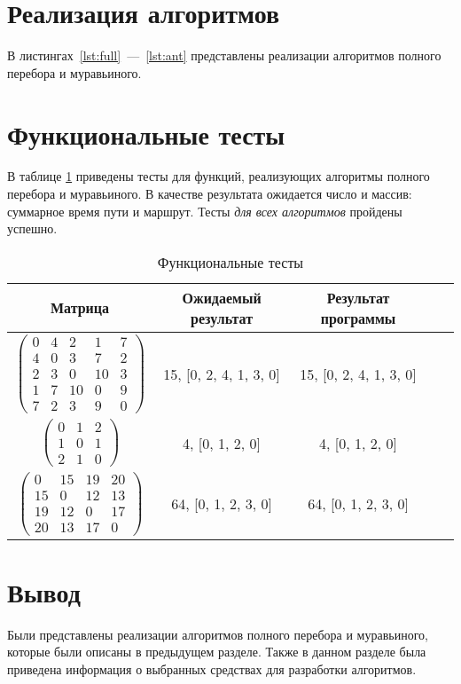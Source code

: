 \section{Реализация алгоритмов}

В листингах~\ref{lst:full}~---~\ref{lst:ant} представлены реализации алгоритмов полного перебора и муравьиного.





\section{Функциональные тесты}

В таблице \ref{tbl:functional_test} приведены тесты для функций, реализующих алгоритмы полного перебора и муравьиного. В качестве результата ожидается число и массив: суммарное время пути и маршрут. Тесты \textit{для всех алгоритмов} пройдены успешно. 

\newpage
\begin{center}
	\captionsetup{justification=raggedright,singlelinecheck=off}
	\begin{longtable}[c]{|c|c|c|c|c|}
		\caption{Функциональные тесты\label{tbl:functional_test}} \\ \hline
		Матрица & Ожидаемый результат & Результат программы \\
		\hline
		$ \begin{pmatrix}
			0 &  4 &  2 &  1 & 7 \\
			4 &  0 &  3 &  7 & 2 \\
			2 &  3 &  0 & 10 & 3 \\
			1 &  7 & 10 &  0 & 9 \\
			7 &  2 &  3 &  9 & 0
		\end{pmatrix}$ &
		15, [0, 2, 4, 1, 3, 0] &
		15, [0, 2, 4, 1, 3, 0] \\
		
		$ \begin{pmatrix}
			0 & 1 & 2 \\
			1 & 0 & 1 \\
			2 & 1 & 0	
		\end{pmatrix}$ &
		4, [0, 1, 2, 0] &
		4, [0, 1, 2, 0] \\
		
		$ \begin{pmatrix}
			0 & 15 & 19 & 20 \\
			15 &  0 & 12 & 13 \\
			19 & 12 &  0 & 17 \\
			20 & 13 & 17 &  0
		\end{pmatrix}$ &
		64, [0, 1, 2, 3, 0] &
		64, [0, 1, 2, 3, 0] \\
		\hline
	\end{longtable}
\end{center}

\section{Вывод}

Были представлены реализации алгоритмов полного перебора и муравьиного, которые были описаны в предыдущем разделе. Также в данном разделе была приведена информация о выбранных средствах для разработки алгоритмов.